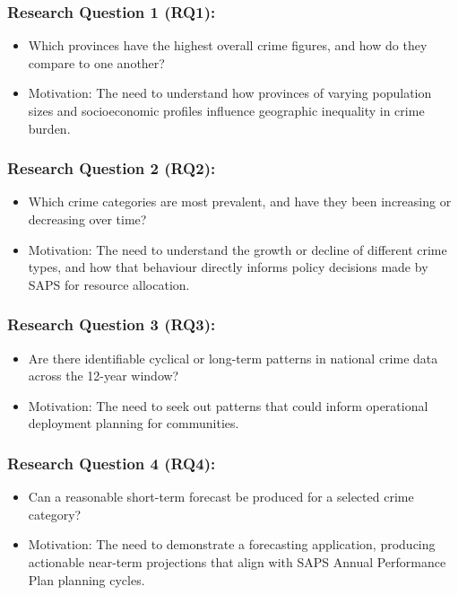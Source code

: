 \documentclass[titlepage, 12pt, oneside]{article}
\numberwithin{equation}{section}
\begin{document}
	\subsubsection*{\textbf{Research Question 1 (RQ1):}}
	\begin{itemize}
		\item Which provinces have the highest overall crime figures, and how do they compare to one another? 
		\item Motivation: The need to understand how provinces of varying population sizes and socioeconomic profiles influence geographic inequality in crime burden. 
	\end{itemize}
	
	\subsubsection*{\textbf{Research Question 2 (RQ2):}}
	\begin{itemize}
		\item Which crime categories are most prevalent, and have they been increasing or decreasing over time?
		\item Motivation: The need to understand the growth or decline of different crime types, and how that behaviour directly informs policy decisions made by SAPS for resource allocation. 
	\end{itemize}
	
	\subsubsection*{\textbf{Research Question 3 (RQ3):}}
	\begin{itemize}
		\item Are there identifiable cyclical or long-term patterns in national crime data across the 12-year window?
		\item Motivation: The need to seek out patterns that could inform operational deployment planning for communities.
	\end{itemize}
	
	\subsubsection*{\textbf{Research Question 4 (RQ4):}}
	\begin{itemize}
		\item Can a reasonable short-term forecast be produced for a selected crime category? 
		\item Motivation: The need to demonstrate a forecasting application, producing actionable near-term projections that align with SAPS Annual Performance Plan planning cycles. 
	\end{itemize}
	
\end{document}

